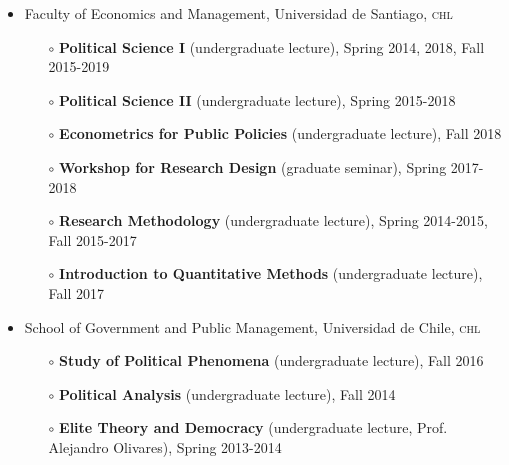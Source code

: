 \documentclass[letterpaper,margin]{res}
\begin{document}
\begin{resume}
\begin{itemize}
\item{\small Faculty of Economics and Management, Universidad de Santiago, {\scshape chl}}
\begin{itemize}
\item[$\circ$]{\small {\bf Political Science I} (undergraduate lecture), Spring 2014, 2018, Fall 2015-2019}
\item[$\circ$]{\small {\bf Political Science II} (undergraduate lecture), Spring 2015-2018}
\item[$\circ$]{\small {\bf Econometrics for Public Policies} (undergraduate lecture), Fall 2018}
\item[$\circ$]{\small {\bf Workshop for Research Design} (graduate seminar), Spring 2017-2018}
\item[$\circ$]{\small {\bf Research Methodology} (undergraduate lecture), Spring 2014-2015, Fall 2015-2017}
\item[$\circ$]{\small {\bf Introduction to Quantitative Methods} (undergraduate lecture), Fall 2017}
\end{itemize}
\item{\small School of Government and Public Management, Universidad de Chile, {\scshape chl}}
\begin{itemize}
\item[$\circ$]{\small {\bf Study of Political Phenomena} (undergraduate lecture), Fall 2016}
\item[$\circ$]{\small {\bf Political Analysis} (undergraduate lecture), Fall 2014}
\item[$\circ$]{\small {\bf Elite Theory and Democracy} (undergraduate lecture, Prof. Alejandro Olivares), Spring 2013-2014}
\end{itemize}
\end{itemize}



\end{resume}
\end{document}
